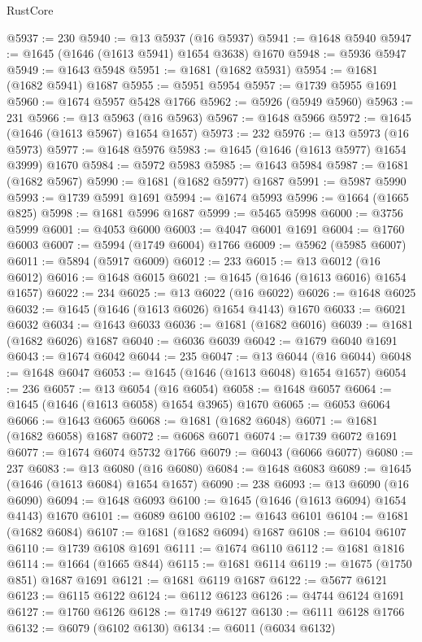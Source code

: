 \begin{lexlean}{RustCore}
\begin{coremodule}
@5937 := 230
@5940 := @13 @5937 (@16 @5937)
@5941 := @1648 @5940
@5947 := @1645 (@1646 (@1613 @5941) @1654 @3638) @1670
@5948 := @5936 @5947
@5949 := @1643 @5948
@5951 := @1681 (@1682 @5931)
@5954 := @1681 (@1682 @5941) @1687
@5955 := @5951 @5954
@5957 := @1739 @5955 @1691
@5960 := @1674 @5957 @5428 @1766
@5962 := @5926 (@5949 @5960)
@5963 := 231
@5966 := @13 @5963 (@16 @5963)
@5967 := @1648 @5966
@5972 := @1645 (@1646 (@1613 @5967) @1654 @1657)
@5973 := 232
@5976 := @13 @5973 (@16 @5973)
@5977 := @1648 @5976
@5983 := @1645 (@1646 (@1613 @5977) @1654 @3999) @1670
@5984 := @5972 @5983
@5985 := @1643 @5984
@5987 := @1681 (@1682 @5967)
@5990 := @1681 (@1682 @5977) @1687
@5991 := @5987 @5990
@5993 := @1739 @5991 @1691
@5994 := @1674 @5993
@5996 := @1664 (@1665 @825)
@5998 := @1681 @5996 @1687
@5999 := @5465 @5998
@6000 := @3756 @5999
@6001 := @4053 @6000
@6003 := @4047 @6001 @1691
@6004 := @1760 @6003
@6007 := @5994 (@1749 @6004) @1766
@6009 := @5962 (@5985 @6007)
@6011 := @5894 (@5917 @6009)
@6012 := 233
@6015 := @13 @6012 (@16 @6012)
@6016 := @1648 @6015
@6021 := @1645 (@1646 (@1613 @6016) @1654 @1657)
@6022 := 234
@6025 := @13 @6022 (@16 @6022)
@6026 := @1648 @6025
@6032 := @1645 (@1646 (@1613 @6026) @1654 @4143) @1670
@6033 := @6021 @6032
@6034 := @1643 @6033
@6036 := @1681 (@1682 @6016)
@6039 := @1681 (@1682 @6026) @1687
@6040 := @6036 @6039
@6042 := @1679 @6040 @1691
@6043 := @1674 @6042
@6044 := 235
@6047 := @13 @6044 (@16 @6044)
@6048 := @1648 @6047
@6053 := @1645 (@1646 (@1613 @6048) @1654 @1657)
@6054 := 236
@6057 := @13 @6054 (@16 @6054)
@6058 := @1648 @6057
@6064 := @1645 (@1646 (@1613 @6058) @1654 @3965) @1670
@6065 := @6053 @6064
@6066 := @1643 @6065
@6068 := @1681 (@1682 @6048)
@6071 := @1681 (@1682 @6058) @1687
@6072 := @6068 @6071
@6074 := @1739 @6072 @1691
@6077 := @1674 @6074 @5732 @1766
@6079 := @6043 (@6066 @6077)
@6080 := 237
@6083 := @13 @6080 (@16 @6080)
@6084 := @1648 @6083
@6089 := @1645 (@1646 (@1613 @6084) @1654 @1657)
@6090 := 238
@6093 := @13 @6090 (@16 @6090)
@6094 := @1648 @6093
@6100 := @1645 (@1646 (@1613 @6094) @1654 @4143) @1670
@6101 := @6089 @6100
@6102 := @1643 @6101
@6104 := @1681 (@1682 @6084)
@6107 := @1681 (@1682 @6094) @1687
@6108 := @6104 @6107
@6110 := @1739 @6108 @1691
@6111 := @1674 @6110
@6112 := @1681 @1816
@6114 := @1664 (@1665 @844)
@6115 := @1681 @6114
@6119 := @1675 (@1750 @851) @1687 @1691
@6121 := @1681 @6119 @1687
@6122 := @5677 @6121
@6123 := @6115 @6122
@6124 := @6112 @6123
@6126 := @4744 @6124 @1691
@6127 := @1760 @6126
@6128 := @1749 @6127
@6130 := @6111 @6128 @1766
@6132 := @6079 (@6102 @6130)
@6134 := @6011 (@6034 @6132)

\end{coremodule}
\end{lexlean}

